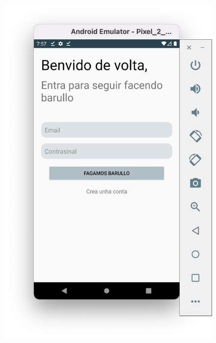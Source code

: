 \documentclass[a4paper,12pt]{article}
\begin{document}
\begin{figure}[H]
	\centering
	\includegraphics[scale=.42]{9.png}
\end{figure}
\end{document}
